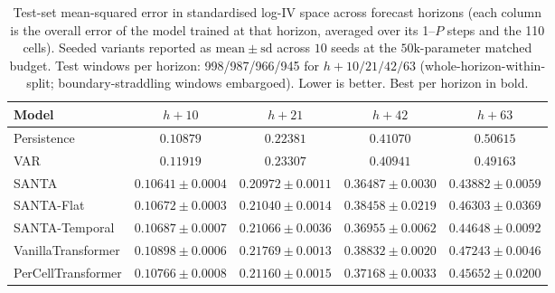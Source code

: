 \begin{table}[h]
\centering
\caption{Test-set mean-squared error in standardised log-IV space across forecast horizons (each column is the overall error of the model trained at that horizon, averaged over its 1--$P$ steps and the 110 cells). Seeded variants reported as $\mathrm{mean}\pm\mathrm{sd}$ across $10$ seeds at the $50\mathrm{k}$-parameter matched budget. Test windows per horizon: 998/987/966/945 for $h{+}10/21/42/63$ (whole-horizon-within-split; boundary-straddling windows embargoed). Lower is better. Best per horizon in bold.}
\label{tab:headline_mse}
\begin{tabular}{lcccc}
\toprule
Model & $h{+}10$ & $h{+}21$ & $h{+}42$ & $h{+}63$ \\
\midrule
Persistence            & $0.10879$ & $0.22381$ & $0.41070$ & $0.50615$ \\
VAR                    & $0.11919$ & $0.23307$ & $0.40941$ & $0.49163$ \\
\midrule
SANTA                  & $\mathbf{0.10641 \pm 0.0004}$ & $\mathbf{0.20972 \pm 0.0011}$ & $\mathbf{0.36487 \pm 0.0030}$ & $\mathbf{0.43882 \pm 0.0059}$ \\
SANTA-Flat             & $0.10672 \pm 0.0003$ & $0.21040 \pm 0.0014$ & $0.38458 \pm 0.0219$ & $0.46303 \pm 0.0369$ \\
SANTA-Temporal         & $0.10687 \pm 0.0007$ & $0.21066 \pm 0.0036$ & $0.36955 \pm 0.0062$ & $0.44648 \pm 0.0092$ \\
\midrule
VanillaTransformer     & $0.10898 \pm 0.0006$ & $0.21769 \pm 0.0013$ & $0.38832 \pm 0.0020$ & $0.47243 \pm 0.0046$ \\
PerCellTransformer     & $0.10766 \pm 0.0008$ & $0.21160 \pm 0.0015$ & $0.37168 \pm 0.0033$ & $0.45652 \pm 0.0200$ \\
\bottomrule
\end{tabular}
\end{table}

